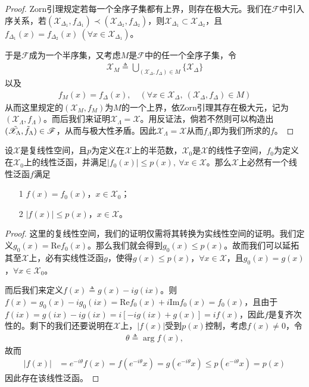 \begin{proof}
		Zorn引理规定若每一个全序子集都有上界，则存在极大元。我们在$\mathscr{F}$中引入序关系，若$(\mathscr{X}_{\Delta_1},f_{\Delta_1})\prec (\mathscr{X}_{\Delta_2},f_{\Delta_2})$，则$\mathscr{X}_{\Delta_1}\subset \mathscr{X}_{\Delta_2}$，且$f_{\Delta_1}(x) = f_{\Delta_2}(x)\ (\forall x\in \mathscr{X}_{\Delta_1})$。
		
		于是$\mathscr{F}$成为一个半序集，又考虑$M$是$\mathscr{F}$中的任一个全序子集，令
		\begin{align*}
			\mathscr{X}_M \triangleq \bigcup\limits_{(\mathscr{X}_{\Delta},f_{\Delta})\in M} 
			\{\mathscr{X}_{\Delta}\}
		\end{align*}
		以及
		\begin{align*}
			f_M(x) = f_{\Delta}(x), \quad (\forall x\in\mathscr{X}_{\Delta},\ (\mathscr{X}_{\Delta}, f_{\Delta})\in M)
		\end{align*}
		从而这里规定的$(\mathscr{X}_M,f_M)$为$M$的一个上界，依Zorn引理其存在极大元，记为$(\mathscr{X}_{\Lambda}, f_{\Lambda})$。而后我们来证明$\mathscr{X}_{\Lambda} = \mathscr{X}$。用反证法，倘若不然则可以构造出$(\Tilde{\mathscr{X}}_{\Lambda}, \Tilde{f}_{\Lambda})\in \mathscr{F}$，从而与极大性矛盾。因此$\mathscr{X}_{\Lambda} = \mathscr{X}$从而$f_{\Lambda}$即为我们所求的$f$。
	\end{proof}
	
	\begin{theorem}
		设$\mathscr{X}$是复线性空间，且$p$为定义在$\mathscr{X}$上的半范数，$\mathscr{X}_0$是$\mathscr{X}$的线性子空间，$f_0$为定义在$\mathscr{X}_0$上的线性泛函，并满足$|f_0(x)| \leqslant p(x),\ \forall x\in\mathscr{X}$。那么$\mathscr{X}$上必然有一个线性泛函$f$满足
		\begin{itemize}
			\item[1] $f(x) = f_0(x)$，$x\in\mathscr{X}_0$；
			\item[2] $|f(x)| \leqslant p(x)$，$x\in\mathscr{X}$。
		\end{itemize}
	\end{theorem}
	\begin{proof}
		这里的复线性空间，我们的证明仅需将其转换为实线性空间的证明。我们定义$g_0(x) = \text{Re} f_0(x)$。那么我们就会得到$g_0(x)\leqslant p(x)$。故而我们可以延拓其至$\mathscr{X}$上，必有实线性泛函$g$，使得$g(x)\leqslant p(x)$，$\forall x\in\mathscr{X}$，且$g_0(x) = g(x)$，$\forall x\in \mathscr{X}_0$。
		
		而后我们来定义$f(x)\triangleq g(x) - ig(ix)$。则$f(x) = g_0(x) - ig_0(ix) = \text{Re}f_0(x) + i\text{Im}f_0(x) = f_0(x)$，且由于$f(ix) = g(ix) - ig(ix) = i[-ig(ix) + g(x)] = if(x)$，因此$f$是复齐次性的。剩下的我们还要说明在$\mathscr{X}$上，$|f(x)|$受到$p(x)$控制，考虑$f(x)\neq 0$，令
		\begin{align*}
			\theta \triangleq \arg f(x),
		\end{align*}
		故而
		\begin{align*}
			|f(x)| &= e^{-i\theta} f(x) = f(e^{-i\theta}x) = g(e^{-i\theta}x) \leqslant p(e^{-i\theta} x) = p(x)
		\end{align*}
		因此存在该线性泛函。
	\end{proof}
	
